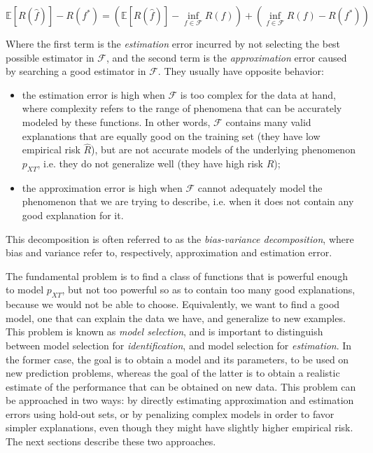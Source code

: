 \documentclass[a4paper]{book}
\begin{document}
\begin{equation}
\mathbb{E}[R(\hat{f})]-R(f^*)=
\left(\mathbb{E}[R(\hat{f})]-\inf_{f\in\mathcal{F}} R(f)\right)
+\left(\inf_{f\in\mathcal{F}} R(f)-R(f^*)\right)
\end{equation}

Where the first term is the \emph{estimation} error incurred by not selecting the best possible estimator in $\mathcal{F}$, and the second term is the \emph{approximation} error caused by searching a good estimator in $\mathcal{F}$. They usually have opposite behavior:

\begin{itemize}
\item the estimation error is high when $\mathcal{F}$ is too complex for the data at hand, where complexity refers to the range of phenomena that can be accurately modeled by these functions. In other words, $\mathcal{F}$ contains many valid explanations that are equally good on the training set (they have low empirical risk $\hat{R}$), but are not accurate models of the underlying phenomenon $p_{XT}$, i.e. they do not generalize well (they have high risk $R$);
\item the approximation error is high when $\mathcal{F}$ cannot adequately model the phenomenon that we are trying to describe, i.e. when it does not contain any good explanation for it.
\end{itemize}

This decomposition is often referred to as the \emph{bias-variance decomposition}, where bias and variance refer to, respectively, approximation and estimation error.

The fundamental problem is to find a class of functions that is powerful enough to model $p_{XT}$, but not too powerful so as to contain too many good explanations, because we would not be able to choose. Equivalently, we want to find a good model, one that can explain the data we have, and generalize to new examples. This problem is known as \emph{model selection}, and is important to distinguish between model selection for \emph{identification}, and model selection for \emph{estimation}. In the former case, the goal is to obtain a model and its parameters, to be used on new prediction problems, whereas the goal of the latter is to obtain a realistic estimate of the performance that can be obtained on new data. This problem can be approached in two ways: by directly estimating approximation and estimation errors using hold-out sets, or by penalizing complex models in order to favor simpler explanations, even though they might have slightly higher empirical risk. The next sections describe these two approaches.
\end{document}
